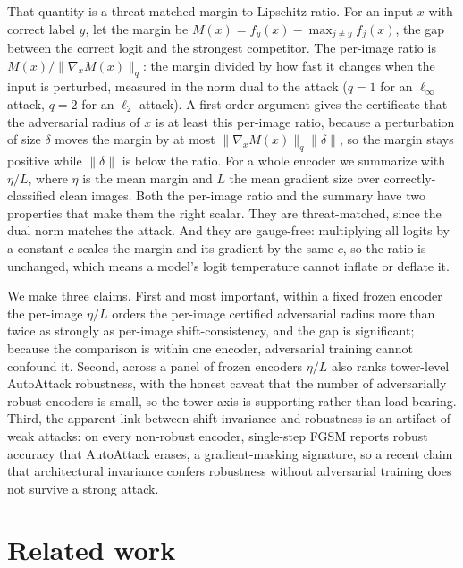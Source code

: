 \documentclass{article}
\newcommand{\etaL}{\ensuremath{\eta/L}}
\begin{document}
That quantity is a threat-matched margin-to-Lipschitz ratio. For an input $x$ with correct label $y$,
let the margin be $M(x) = f_y(x) - \max_{j\neq y} f_j(x)$, the gap between the correct logit and the
strongest competitor. The per-image ratio is $M(x) / \lVert \nabla_x M(x) \rVert_q$: the margin divided
by how fast it changes when the input is perturbed, measured in the norm dual to the attack ($q=1$ for
an $\ell_\infty$ attack, $q=2$ for an $\ell_2$ attack). A first-order argument gives the certificate
that the adversarial radius of $x$ is at least this per-image ratio, because a perturbation of size
$\delta$ moves the margin by at most $\lVert \nabla_x M(x) \rVert_q \lVert \delta \rVert$, so the margin
stays positive while $\lVert \delta \rVert$ is below the ratio. For a whole encoder we summarize with
$\etaL$, where $\eta$ is the mean margin and $L$ the mean gradient size over correctly-classified clean
images. Both the per-image ratio and the summary have two properties that make them the right scalar.
They are threat-matched, since the dual norm matches the attack. And they are gauge-free: multiplying
all logits by a constant $c$ scales the margin and its gradient by the same $c$, so the ratio is
unchanged, which means a model's logit temperature cannot inflate or deflate it.

We make three claims. First and most important, within a fixed frozen encoder the per-image $\etaL$
orders the per-image certified adversarial radius more than twice as strongly as per-image
shift-consistency, and the gap is significant; because the comparison is within one encoder,
adversarial training cannot confound it. Second, across a panel of frozen encoders $\etaL$ also ranks
tower-level AutoAttack robustness, with the honest caveat that the number of adversarially robust
encoders is small, so the tower axis is supporting rather than load-bearing. Third, the apparent link
between shift-invariance and robustness is an artifact of weak attacks: on every non-robust encoder,
single-step FGSM reports robust accuracy that AutoAttack erases, a gradient-masking signature, so a
recent claim that architectural invariance confers robustness without adversarial training does not
survive a strong attack.

\section{Related work}
\label{sec:related}
\end{document}
